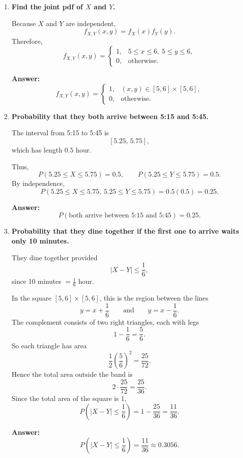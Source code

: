 \documentclass[11pt]{article}
\begin{document}
\begin{enumerate}
    \item[(a)] \textbf{Find the joint pdf of $X$ and $Y$.}

    Because $X$ and $Y$ are independent,
    \[
    f_{X,Y}(x,y)=f_X(x)f_Y(y).
    \]
    Therefore,
    \[
    f_{X,Y}(x,y)=
    \begin{cases}
    1, & 5\le x\le 6,\ 5\le y\le 6,\\
    0, & \text{otherwise}.
    \end{cases}
    \]

    \textbf{Answer:}
    \[
    f_{X,Y}(x,y)=
    \begin{cases}
    1, & (x,y)\in [5,6]\times [5,6],\\
    0, & \text{otherwise}.
    \end{cases}
    \]

    \item[(b)] \textbf{Probability that they both arrive between 5:15 and 5:45.}

    The interval from 5:15 to 5:45 is
    \[
    \left[5.25,\,5.75\right],
    \]
    which has length $0.5$ hour.

    Thus,
    \[
    P(5.25\le X\le 5.75)=0.5,
    \qquad
    P(5.25\le Y\le 5.75)=0.5.
    \]
    By independence,
    \[
    P(5.25\le X\le 5.75,\ 5.25\le Y\le 5.75)=0.5(0.5)=0.25.
    \]

    \textbf{Answer:}
    \[
    P(\text{both arrive between 5:15 and 5:45})=0.25.
    \]

    \item[(c)] \textbf{Probability that they dine together if the first one to arrive waits only 10 minutes.}

    They dine together provided
    \[
    |X-Y|\le \frac{1}{6},
    \]
    since 10 minutes $=\frac{1}{6}$ hour.

    In the square $[5,6]\times[5,6]$, this is the region between the lines
    \[
    y=x+\frac{1}{6}
    \qquad \text{and} \qquad
    y=x-\frac{1}{6}.
    \]
    The complement consists of two right triangles, each with legs
    \[
    1-\frac{1}{6}=\frac{5}{6}.
    \]
    So each triangle has area
    \[
    \frac12\left(\frac{5}{6}\right)^2=\frac{25}{72}.
    \]
    Hence the total area outside the band is
    \[
    2\cdot \frac{25}{72}=\frac{25}{36}.
    \]
    Since the total area of the square is $1$,
    \[
    P\left(|X-Y|\le \frac{1}{6}\right)=1-\frac{25}{36}=\frac{11}{36}.
    \]

    \textbf{Answer:}
    \[
    P\left(|X-Y|\le \frac{1}{6}\right)=\frac{11}{36}\approx 0.3056.
    \]
\end{enumerate}
\end{document}
